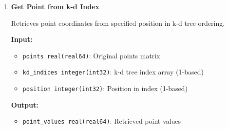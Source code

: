 \documentclass[11pt]{article}
\begin{document}
\begin{enumerate}
\begin{enumerate}
\begin{itemize}
	      	      	\item \texttt{num\_dimensions integer(int32)}: Number of dimensions
	      	      	      
	      	      	\item \texttt{num\_vectors integer(int32)}: Number of vectors
	      	      	      
	      	      	\item \texttt{dimension\_order integer(int32)}: Dimension ordering for
	      	      	      splitting (1-based)
	      	      \end{itemize}
	      	      \textbf{Output:}
	      	      \begin{itemize}
	      	      	\item \texttt{sphere\_indices integer(int32)}: Output index array (1-based)
	      	      	      
	      	      	\item Various workspace arrays (same as build\_kd\_index)
	      	      	      
	      	      	\item \texttt{ierr integer(int32)}: Error code
	      	      \end{itemize}
	      	      \begin{lstlisting}[language=Fortran]
call build_spherical_kd(vectors, num_dimensions, num_vectors, &
                        sphere_indices, dimension_order, workspace, &
                        value_buffer, permutation, left_stack, & 
                        right_stack, recursion_stack, ierr)
	      	      \end{lstlisting}
	      	      
	      	\item \textbf{Get Point from k-d Index}
	      	      
	      	      Retrieves point coordinates from specified position in k-d tree ordering.
	      	      
	      	      \textbf{Input:}
	      	      \begin{itemize}
	      	      	\item \texttt{points real(real64)}: Original points matrix
	      	      	      
	      	      	\item \texttt{kd\_indices integer(int32)}: k-d tree index array (1-based)
	      	      	      
	      	      	\item \texttt{position integer(int32)}: Position in index (1-based)
	      	      \end{itemize}
	      	      \textbf{Output:}
	      	      \begin{itemize}
	      	      	\item \texttt{point\_values real(real64)}: Retrieved point values
	      	      	      

\end{itemize}
\end{enumerate}
\end{enumerate}
\end{document}

